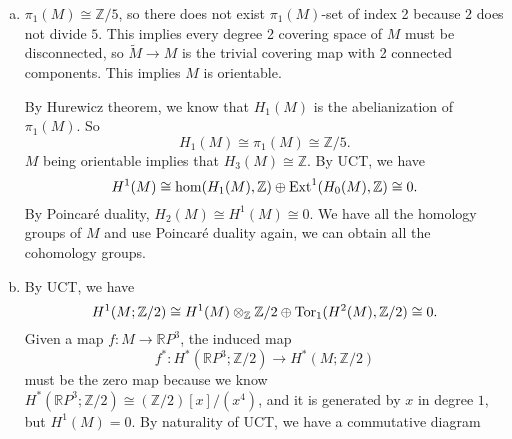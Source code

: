 \documentclass[letterpaper, 12pt]{article}
\begin{document}
\begin{solution}
\begin{enumerate}[(a)]
\item \(\pi_1(M)\cong \mathbb{Z}/5\), so there does not exist \(\pi_1(M)\)-set of index 2 because \(2\) does not divide \(5\). This implies every degree 2 covering space of \(M\) must be disconnected, so \(\tilde{M}\rightarrow M\) is the trivial covering map with 2 connected components. This implies \(M\) is orientable. 

By Hurewicz theorem, we know that \(H_1(M)\) is the abelianization of \(\pi_1(M)\). So 
\[H_1(M)\cong \pi_1(M)\cong \mathbb{Z}/5.\]
\(M\) being orientable implies that \(H_3(M)\cong \mathbb{Z}\). By UCT, we have 
\[H^1(M)\cong \hom(H_1(M),\mathbb{Z})\oplus \text{Ext}^1(H_0(M),\mathbb{Z})\cong 0.\]
By Poincaré duality, \(H_2(M)\cong H^1(M)\cong 0\). We have all the homology groups of \(M\) and use Poincaré duality again, we can obtain all the cohomology groups.
\begin{table}[ht]
    \centering
    \end{table}
\item By UCT, we have 
\[H^1(M;\mathbb{Z}/2)\cong H^1(M)\otimes_\mathbb{Z} \mathbb{Z}/2 \oplus \text{Tor}_1(H^2(M), \mathbb{Z}/2)\cong 0.\]
Given a map \(f:M\rightarrow \mathbb{R}P^3\), the induced map 
\[f^*:H^*(\mathbb{R}P^3;\mathbb{Z}/2)\rightarrow H^*(M;\mathbb{Z}/2)\]
must be the zero map because we know \(H^*(\mathbb{R}P^3;\mathbb{Z}/2)\cong (\mathbb{Z}/2)[x]/(x^4)\), and it is generated by \(x\) in degree \(1\), but \(H^1(M)=0\). By naturality of UCT, we have a commutative diagram 

\end{enumerate}
\end{solution}
\end{document}
